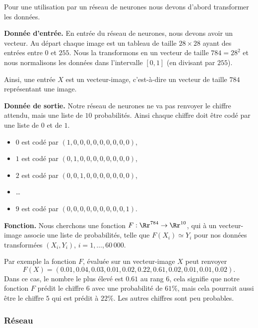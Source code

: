 \documentclass[11pt,class=report,crop=false]{standalone}
\begin{document}
Pour une utilisation par un réseau de neurones nous devons d'abord transformer les données.

\bigskip

\textbf{Donnée d'entrée.} En entrée du réseau de neurones, nous devons avoir un vecteur.
Au départ chaque image est un tableau de taille $28\times 28$ ayant des entrées entre $0$ et $255$. Nous la transformons en un vecteur de taille $784 = 28^2$ et nous normalisons les données dans l'intervalle $[0,1]$ (en divisant par $255$). 


Ainsi, une entrée $X$ est un \og{}vecteur-image\fg{}, c'est-à-dire un vecteur de taille $784$ représentant une image.

\bigskip

\textbf{Donnée de sortie.} Notre réseau de neurones ne va pas renvoyer le chiffre attendu, mais une liste de $10$ probabilités. Ainsi chaque chiffre doit être codé par une liste de $0$ et de $1$.
\begin{itemize}
  \item $0$ est codé par $(1,0,0,0,0,0,0,0,0,0)$,
  \item $1$ est codé par $(0,1,0,0,0,0,0,0,0,0)$, 
  \item $2$ est codé par $(0,0,1,0,0,0,0,0,0,0)$, 
  \item \ldots
  \item $9$ est codé par $(0,0,0,0,0,0,0,0,0,1)$.
\end{itemize}

\bigskip

\textbf{Fonction.}
Nous cherchons une fonction $F : \Rr^{784} \to \Rr^{10}$, qui à un vecteur-image associe une liste de probabilités, telle que 
$F(X_i) \simeq Y_i$ pour nos données transformées $(X_i,Y_i)$, $i=1,\ldots,60\,000$.

Par exemple la fonction $F$, évaluée sur un vecteur-image $X$ peut renvoyer
$$F(X) = (0.01, 0.04, 0.03, 0.01, 0.02, 0.22, 0.61, 0.02, 0.01, 0.01, 0.02).$$
Dans ce cas, le nombre le plus élevé est $0.61$ au rang $6$, cela signifie que notre fonction $F$ prédit le chiffre $6$ avec une probabilité de $61\%$, mais cela pourrait aussi être le chiffre $5$ qui est prédit à $22\%$. Les autres chiffres sont peu probables.



\subsubsection*{Réseau}
\end{document}

